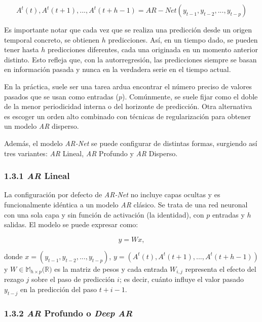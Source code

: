 \documentclass[12pt,twoside]{article}
\begin{document}
\begin{equation}
A^t(t),A^t(t+1),...,A^t(t+h-1) = AR-Net(y_{t-1},y_{t-2},...,y_{t-p})
\end{equation}

Es importante notar que cada vez que se realiza una predicción desde un origen temporal concreto, se obtienen $h$ predicciones. Así, en un tiempo dado, se pueden tener hasta $h$ predicciones diferentes, cada una originada en un momento anterior distinto. Esto refleja que, con la autorregresión, las predicciones siempre se basan en información pasada y nunca en la verdadera serie en el tiempo actual.

En la práctica, suele ser una tarea ardua encontrar el número preciso de valores pasados que se usan como entradas ($p$). Comúnmente, se suele fijar como el doble de la menor periodicidad interna o del horizonte de predicción. Otra alternativa es escoger un orden alto combinado con técnicas de regularización para obtener un modelo \textit{AR} disperso.

Además, el modelo \textit{AR-Net} se puede configurar de distintas formas, surgiendo así tres variantes: \textit{AR} Lineal, \textit{AR} Profundo y \textit{AR} Disperso.

\subsubsection*{1.3.1 \textit{AR} Lineal}\label{sec:25}

La configuración por defecto de \textit{AR-Net} no incluye capas ocultas y es funcionalmente idéntica a un modelo \textit{AR} clásico. Se trata de una red neuronal con una sola capa y sin función de activación (la identidad), con $p$ entradas y $h$ salidas. El modelo se puede expresar como: 

\begin{equation}
y=Wx,
\end{equation}

donde $x=(y_{t-1},y_{t-2},...,y_{t-p})$, $y=(A^t(t),A^t(t+1),...,A^t(t+h-1))$ y $W \in \mathbb{M}_{h \times p}(\mathbb{R)}$ es la matriz de pesos y cada entrada $W_{i,j}$ representa el efecto del rezago $j$ sobre el paso de predicción $i$; es decir, cuánto influye el valor pasado $y_{t-j}$ en la predicción del paso $t+i-1$.

\subsubsection*{1.3.2 \textit{AR} Profundo o \textit{Deep AR}}\label{sec:26}
\end{document}

